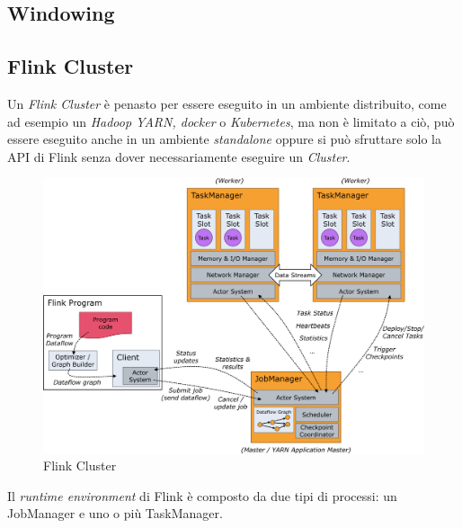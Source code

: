 
\subsection{Windowing}
\label{subsec:flink_windowing}

\subsection{Flink Cluster}
\label{subsec:flink_cluster}
Un \textit{Flink Cluster} è penasto per essere eseguito in un ambiente distribuito, come ad esempio un \textit{Hadoop YARN, docker} o \textit{Kubernetes},
ma non è limitato a ciò, può essere eseguito anche in un ambiente \textit{standalone} oppure si può sfruttare solo la API di Flink senza dover necessariamente eseguire un \textit{Cluster}.
\begin{figure}[htbp]
    \centering
    \includegraphics[width=\textwidth]{images/flink/cluster.jpg}
    \caption{Flink Cluster}
    \label{fig:flink_cluster}
\end{figure}
Il \textit{runtime environment} di Flink è composto da due tipi di processi: un JobManager e uno o più TaskManager.
